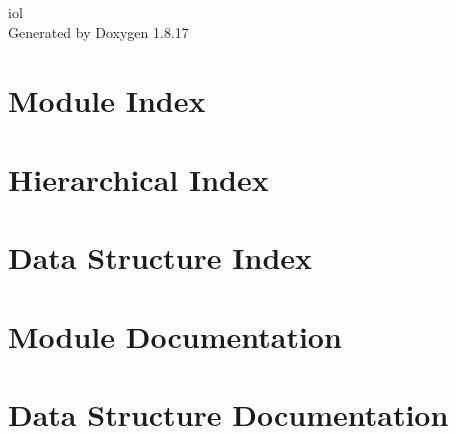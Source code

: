 \let\mypdfximage\pdfximage\def\pdfximage{\immediate\mypdfximage}\documentclass[twoside]{book}
\newcommand{\+}{\discretionary{\mbox{\scriptsize$\hookleftarrow$}}{}{}}
\newcommand{\clearemptydoublepage}{%
  \newpage{\pagestyle{empty}\cleardoublepage}%
}
\begin{document}
\begin{titlepage}
\vspace*{7cm}
\begin{center}%
{\Large iol }\\
\vspace*{1cm}
{\large Generated by Doxygen 1.8.17}\\
\end{center}
\end{titlepage}
\clearemptydoublepage
{}
\tableofcontents
\clearemptydoublepage
{}

\chapter{Module Index}

\chapter{Hierarchical Index}

\chapter{Data Structure Index}

\chapter{Module Documentation}





\chapter{Data Structure Documentation}




\backmatter
\newpage
{}
\clearemptydoublepage
{}
\printindex
\end{document}
